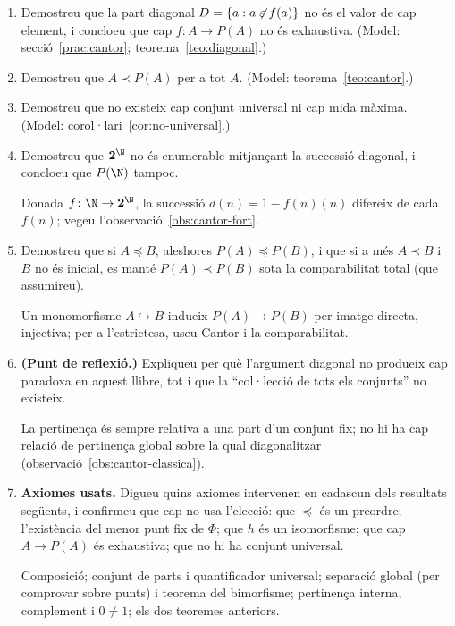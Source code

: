 \begin{enumerate}[resume]
  \item Demostreu que la part diagonal \(D=\{a : a\not\mathrel{\varepsilon} f(a)\}\) no és el valor de cap element, i concloeu que cap \(f\colon A\to P(A)\) no és exhaustiva. (Model: secció~\ref{prac:cantor}; teorema~\ref{teo:diagonal}.)

  \item Demostreu que \(A\prec P(A)\) per a tot \(A\). (Model: teorema~\ref{teo:cantor}.)

  \item Demostreu que no existeix cap conjunt universal ni cap mida màxima. (Model: corol·lari~\ref{cor:no-universal}.)

  \item Demostreu que \(\mathbf2^{\N}\) no és enumerable mitjançant la successió diagonal, i concloeu que \(P(\N)\) tampoc. \begin{indicacio}Donada \(f\colon\N\to\mathbf2^{\N}\), la successió \(d(n)=1-f(n)(n)\) difereix de cada \(f(n)\); vegeu l'observació~\ref{obs:cantor-fort}.\end{indicacio}

  \item Demostreu que si \(A\preceq B\), aleshores \(P(A)\preceq P(B)\), i que si a més \(A\prec B\) i \(B\) no és inicial, es manté \(P(A)\prec P(B)\) sota la comparabilitat total (que assumireu). \begin{indicacio}Un monomorfisme \(A\hookrightarrow B\) indueix \(P(A)\to P(B)\) per imatge directa, injectiva; per a l'estrictesa, useu Cantor i la comparabilitat.\end{indicacio}

  \item \textbf{(Punt de reflexió.)} Expliqueu per què l'argument diagonal no produeix cap paradoxa en aquest llibre, tot i que la \enquote{col·lecció de tots els conjunts} no existeix. \begin{indicacio}La pertinença és sempre relativa a una part d'un conjunt fix; no hi ha cap relació de pertinença global sobre la qual diagonalitzar (observació~\ref{obs:cantor-classica}).\end{indicacio}

  \item \textbf{Axiomes usats.} Digueu quins axiomes intervenen en cadascun dels resultats següents, i confirmeu que cap no usa l'elecció: que \(\preceq\) és un preordre; l'existència del menor punt fix de \(\Phi\); que \(h\) és un isomorfisme; que cap \(A\to P(A)\) és exhaustiva; que no hi ha conjunt universal. \begin{indicacio}Composició; conjunt de parts i quantificador universal; separació global (per comprovar sobre punts) i teorema del bimorfisme; pertinença interna, complement i \(0\ne1\); els dos teoremes anteriors.\end{indicacio}
\end{enumerate}
